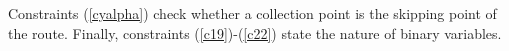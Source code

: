 \documentclass[preprint,11pt,authoryear]{elsarticle}
\begin{document}
Constraints (\ref{cyalpha}) check whether a collection point is %
the skipping point of the route. Finally, constraints (\ref{c19})-(\ref{c22}) state the nature of binary variables.




\vspace{1cm}
\end{document}
